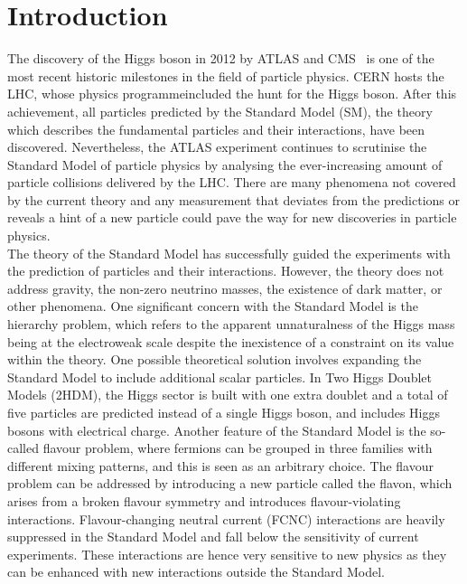 \setchapterpreamble[u]{\margintoc}
\chapter*{Introduction}

The discovery of the Higgs boson in 2012 by ATLAS and CMS~\cite{ATLASHiggs2012,CMShiggs2012} is one of the most recent historic milestones in the field of particle physics. CERN hosts the LHC, whose physics programmeincluded the hunt for the Higgs boson. After this achievement, all particles predicted by the Standard Model (SM), the theory which describes the fundamental particles and their interactions, have been discovered. Nevertheless, the ATLAS experiment continues to scrutinise the Standard Model of particle physics by analysing the ever-increasing amount of particle collisions delivered by the LHC. There are many phenomena not covered by the current theory and any measurement that deviates from the predictions or reveals a hint of a new particle could pave the way for new discoveries in particle physics.\\

The theory of the Standard Model has successfully guided the experiments with the prediction of particles and their interactions. However, the theory does not address gravity, the non-zero neutrino masses, the existence of dark matter, or other phenomena. One significant concern with the Standard Model is the hierarchy problem, which refers to the apparent unnaturalness of the Higgs mass being at the electroweak scale despite the inexistence of a constraint on its value within the theory. One possible theoretical solution involves expanding the Standard Model to include additional scalar particles. In Two Higgs Doublet Models (2HDM), the Higgs sector is built with one extra doublet and a total of five particles are predicted instead of a single Higgs boson, and includes Higgs bosons with electrical charge.
Another feature of the Standard Model is the so-called flavour problem, where fermions can be grouped in three families with different mixing patterns, and this is seen as an arbitrary choice. The flavour problem can be addressed by introducing a new particle called the flavon, which arises from a broken flavour symmetry and introduces flavour-violating interactions. Flavour-changing neutral current (FCNC) interactions are heavily suppressed in the Standard Model and fall below the sensitivity of current experiments. These interactions are hence very sensitive to new physics as they can be enhanced with new interactions outside the Standard Model.\\


